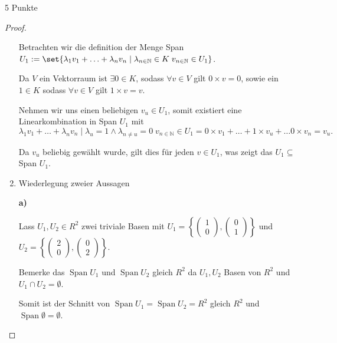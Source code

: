 \documentclass{problemset}
\begin{document}
\begin{problem}{5 Punkte}
\begin{proof}
\begin{enumerate}
              Betrachten wir die definition der Menge Span $U_1 :=
              \set{\lambda_1 v_1 + \ldots + \lambda_n v_n \mid \lambda_{n \in
              \mathbb{N}} \in K \; v_{n \in \mathbb{N}} \in U_1}$.

              Da $V$ ein Vektorraum ist $\exists 0 \in K$, sodass $\forall v
              \in V$ gilt $0 \times v = 0$, sowie ein $1 \in K$ sodass $\forall
              v \in V$ gilt $1 \times v = v$.

              Nehmen wir uns einen beliebigen $v_u \in U_1$, somit existiert
              eine Linearkombination in Span $U_1$ mit \[
                  \lambda_1 v_1 + \ldots + \lambda_n v_n \mid \lambda_u = 1 \land \lambda_{n \ne u} = 0 \; v_{n \in \mathbb{N}} \in U_1 = 0 \times v_1 + \ldots + 1 \times v_u + \ldots 0 \times v_n = v_u.
              \]

              Da \(v_u\) beliebig gewählt wurde, gilt dies für jeden \(v \in
              U_1\), was zeigt das $U_1 \subseteq$ Span $U_1$. \checkmark
        \item Wiederlegung zweier Aussagen

              \textbf{a)}

              Lass \(U_1, U_2 \in R^2\) zwei triviale Basen mit \(U_1 = \left\{\begin{pmatrix}
                  1 \\ 0
              \end{pmatrix},
              \begin{pmatrix}
                  0 \\ 1
              \end{pmatrix}\right\}\) und \(U_2 = \left\{\begin{pmatrix}
                  2 \\ 0
              \end{pmatrix},
              \begin{pmatrix}
                  0 \\ 2
              \end{pmatrix}\right\}\).

              Bemerke das \(\operatorname{Span} U_1\) und \(\operatorname{Span}
              U_2\) gleich \(R^2\) da \(U_1, U_2\) Basen von \(R^2\) und \(U_1
              \cap U_2 = \emptyset \).

              Somit ist der Schnitt von \(\operatorname{Span} U_1 =
              \operatorname{Span} U_2 = R^2\) gleich \(R^2\) und
              \(\operatorname{Span} \emptyset = \emptyset\).


\end{enumerate}
\end{proof}
\end{problem}
\end{document}
